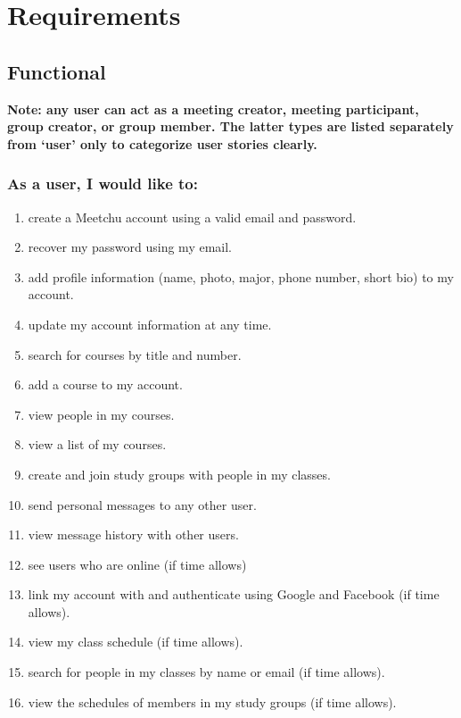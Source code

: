 \documentclass[12pt]{article}
\begin{document}
\newpage

\section{Requirements}

\subsection*{Functional}

\textbf{Note: any user can act as a meeting creator, meeting participant, group creator, or group member. The latter types are listed separately from ‘user' only to categorize user stories clearly.}

\subsubsection*{As a user, I would like to:}

\begin{enumerate}[nolistsep]
    \item create a Meetchu account using a valid email and password.
    \item recover my password using my email.
    \item add profile information (name, photo, major, phone number, short bio) to my account.
    \item update my account information at any time.
    \item search for courses by title and number.
    \item add a course to my account.
    \item view people in my courses.
    \item view a list of my courses.
    \item create and join study groups with people in my classes.
    \item send personal messages to any other user.
    \item view message history with other users.
    \item see users who are online (if time allows)
    \item link my account with and authenticate using Google and Facebook (if time allows).
    \item view my class schedule (if time allows).
    \item search for people in my classes by name or email (if time allows).
    \item view the schedules of members in my study groups (if time allows).
\end{enumerate}
\end{document}
